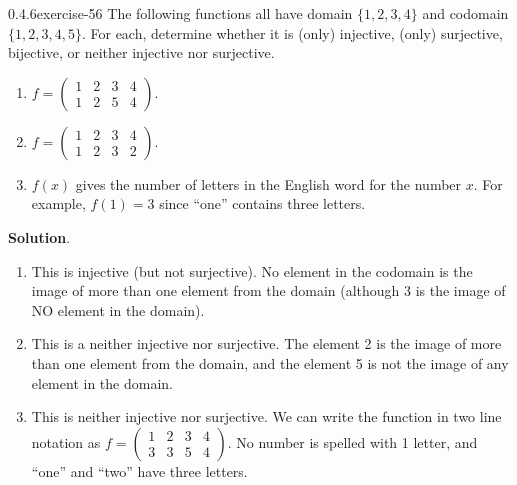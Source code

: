\documentclass[twoside,11pt,]{book}
\numberwithin{equation}{chapter}
\newcommand{\twoline}[2]{\begin{pmatrix}#1 \\ #2 \end{pmatrix}}
\newcommand{\amp}{&}
\begin{document}
\begin{divisionsolution}{0.4.6}{}{exercise-56}%
\hypertarget{p-983}{}%
The following functions all have domain \(\{1,2,3,4\}\) and codomain \(\{1,2,3,4,5\}\text{.}\) For each, determine whether it is (only) injective, (only) surjective, bijective, or neither injective nor surjective.\leavevmode%
\begin{enumerate}[label=(\alph*)]
\item\hypertarget{li-818}{}\hypertarget{p-984}{}%
\(f = \twoline{1 \amp 2 \amp 3 \amp 4}{1 \amp 2 \amp 5 \amp 4}\text{.}\) %
\item\hypertarget{li-824}{}\hypertarget{p-985}{}%
\(f = \twoline{1 \amp 2 \amp 3 \amp 4}{1 \amp 2 \amp 3 \amp 2}\text{.}\) %
\item\hypertarget{li-830}{}\hypertarget{p-986}{}%
\(f(x)\) gives the number of letters in the English word for the number \(x\text{.}\) For example, \(f(1) = 3\) since ``one'' contains three letters. %
\end{enumerate}
%
\par\smallskip%
\noindent\textbf{Solution}.\quad%
\hypertarget{p-987}{}%
\leavevmode%
\begin{enumerate}[label=(\alph*)]
\item\hypertarget{li-836}{}\hypertarget{p-988}{}%
This is injective (but not surjective). No element in the codomain is the image of more than one element from the domain (although 3 is the image of NO element in the domain).%
\item\hypertarget{li-837}{}\hypertarget{p-989}{}%
This is a neither injective nor surjective. The element 2 is the image of more than one element from the domain, and the element 5 is not the image of any element in the domain.%
\item\hypertarget{li-838}{}\hypertarget{p-990}{}%
This is neither injective nor surjective. We can write the function in two line notation as \(f = \twoline{1 \amp 2 \amp 3 \amp 4}{3 \amp 3 \amp 5 \amp 4}\text{.}\) No number is spelled with 1 letter, and ``one'' and ``two'' have three letters.%
\end{enumerate}
%
\end{divisionsolution}%
\end{document}
